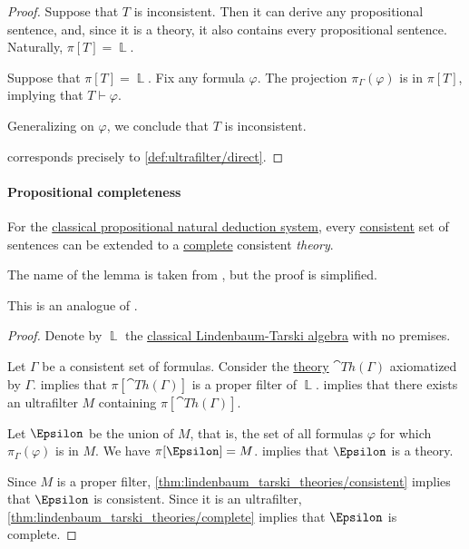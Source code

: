 \begin{proof}
  \SufficiencySubProof* Suppose that \( T \) is inconsistent. Then it can derive any propositional sentence, and, since it is a theory, it also contains every propositional sentence. Naturally, \( \pi[T] = \BbbL \).

  \NecessitySubProof* Suppose that \( \pi[T] = \BbbL \). Fix any formula \( \varphi \). The projection \( \pi_\Gamma(\varphi) \) is in \( \pi[T] \), implying that \( T \vdash \varphi \).

  Generalizing on \( \varphi \), we conclude that \( T \) is inconsistent.

    corresponds precisely to \cref{def:ultrafilter/direct}.
\end{proof}

\paragraph{Propositional completeness}

\begin{lemma}\label{thm:propositional_lindenbaums_lemma}
  For the \hyperref[def:propositional_natural_deduction_system]{classical propositional natural deduction system}, every \hyperref[def:propositional_theory/consistent]{consistent} set of sentences can be extended to a \hyperref[def:propositional_theory/complete]{complete} consistent \emph{theory}.
\end{lemma}
\begin{comments}
  \item The name of the lemma is taken from \cite[lemma 1.3.21]{Герасимов2014Вычислимость}, but the proof is simplified.
  \item This is an analogue of .
\end{comments}
\begin{proof}
  Denote by \( \BbbL \) the \hyperref[thm:lindenbaum_tarski_algebras]{classical Lindenbaum-Tarski algebra} with no premises.

  Let \( \Gamma \) be a consistent set of formulas. Consider the \hyperref[def:propositional_theory]{theory} \( \cat{Th}(\Gamma) \) axiomatized by \( \Gamma \).  implies that \( \pi[\cat{Th}(\Gamma)] \) is a proper filter of \( \BbbL \).  implies that there exists an ultrafilter \( M \) containing \( \pi[\cat{Th}(\Gamma)] \).

  Let \( \Epsilon \) be the union of \( M \), that is, the set of all formulas \( \varphi \) for which \( \pi_\Gamma(\varphi) \) is in \( M \). We have \( \pi[\Epsilon] = M \).  implies that \( \Epsilon \) is a theory.

  Since \( M \) is a proper filter, \cref{thm:lindenbaum_tarski_theories/consistent} implies that \( \Epsilon \) is consistent. Since it is an ultrafilter, \cref{thm:lindenbaum_tarski_theories/complete} implies that \( \Epsilon \) is complete.
\end{proof}

